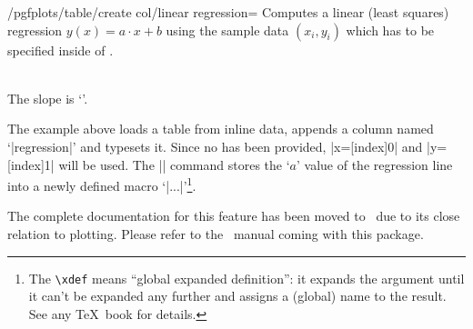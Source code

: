 \begin{stylekey}{/pgfplots/table/create col/linear regression=}%
	Computes a linear (least squares) regression $y(x) = a \cdot x + b$ using the sample data $(x_i,y_i)$ which has to be specified inside of .

\begin{codeexample}[pre={\vbox\bgroup\hsize=3cm},post=\egroup]
\loadedtbl

	{\loadedtbl}
\xdef\slope{\pgfplotstableregressiona}

\pgfplotstabletypeset\loadedtbl\\

The slope is `\slope'.
\end{codeexample}
	\noindent The example above loads a table from inline data, appends a column named `|regression|' and typesets it. Since no  has been provided, |x=[index]0| and |y=[index]1| will be used. The |\xdef\slope{...}| command stores the `$a$' value of the regression line into a newly defined macro `|\slope|'\footnote{The \texttt{\textbackslash xdef} means ``global expanded definition'': it expands the argument until it can't be expanded any further and assigns a (global) name to the result. See any \TeX\ book for details.}.

	The complete documentation for this feature has been moved to \PGFPlots\ due to its close relation to plotting. Please refer to the \PGFPlots\ manual coming with this package.
\end{stylekey}


